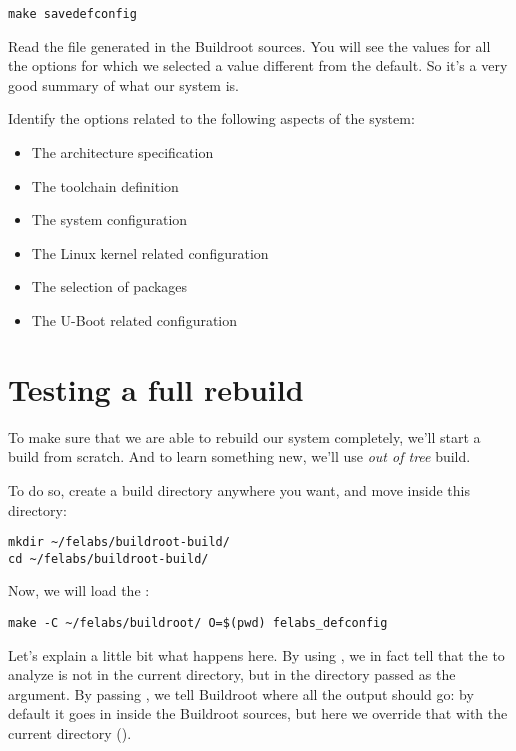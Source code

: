 \begin{verbatim}
make savedefconfig
\end{verbatim}

Read the file  generated in the
Buildroot sources. You will see the values for all the options for
which we selected a value different from the default. So it's a very
good summary of what our system is.

Identify the options related to the following aspects of the system:

\begin{itemize}
\item The architecture specification
\item The toolchain definition
\item The system configuration
\item The Linux kernel related configuration
\item The selection of packages
\item The U-Boot related configuration
\end{itemize}

\section{Testing a full rebuild}

To make sure that we are able to rebuild our system completely, we'll
start a build from scratch. And to learn something new, we'll use {\em
  out of tree} build.

To do so, create a build directory anywhere you want, and move inside
this directory:

\begin{verbatim}
mkdir ~/felabs/buildroot-build/
cd ~/felabs/buildroot-build/
\end{verbatim}

Now, we will load the :

\begin{verbatim}
make -C ~/felabs/buildroot/ O=$(pwd) felabs_defconfig
\end{verbatim}

Let's explain a little bit what happens here. By using
, we in fact tell  that the
 to analyze is not in the current directory, but in the
directory passed as the  argument. By passing , we
tell Buildroot where all the output should go: by default it goes in
 inside the Buildroot sources, but here we override that
with the current directory ().

